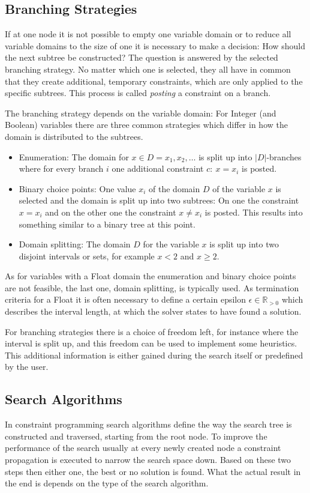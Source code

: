 \documentclass[10pt,
               a4paper,
               journal,
               ]{IEEEtran}
\begin{document}
		\subsection{Branching Strategies}
	If at one node it is not possible to empty one variable domain or to reduce all variable domains to the size of one it is necessary to make a decision: How should the next subtree be constructed? The question is answered by the selected branching strategy. No matter which one is selected, they all have in common that they create additional, temporary constraints, which are only applied to the specific subtrees. This process is called \emph{posting} a constraint on a branch.
	
	The branching strategy depends on the variable domain: For Integer (and Boolean) variables there are three common strategies \cite[p.~87]{handbookCP} which differ in how the domain is distributed to the subtrees.
	\begin{itemize}
		\item Enumeration: The domain for $x \in D = {x_1, x_2, \dots}$ is split up into $|D|$-branches where for every branch $i$ one additional constraint $c:\ x = x_i$ is posted.
		\item Binary choice points: One value $x_i$ of the domain $D$ of the variable $x$ is selected and the domain is split up into two subtrees: On one the constraint $x = x_i$ and on the other one the constraint $x \ne x_i$ is posted. This results into something similar to a binary tree at this point.
		\item Domain splitting: The domain $D$ for the variable $x$ is split up into two disjoint intervals or sets, for example $x < 2$ and $x \ge 2$.
	\end{itemize}
	
	As for variables with a Float domain the enumeration and binary choice points are not feasible, the last one, domain splitting, is typically used. As termination criteria for a Float it is often necessary to define a certain epsilon $\epsilon \in \mathbb{R}_{>0}$ which describes the interval length, at which the solver states to have found a solution.
	
	For branching strategies there is a choice of freedom left, for instance where the interval is split up, and this freedom can be used to implement some heuristics. This additional information is either gained during the search itself or predefined by the user.
	
	\subsection{Search Algorithms}
	In constraint programming search algorithms define the way the search tree is constructed and traversed, starting from the root node. To improve the performance of the search usually at every newly created node a constraint propagation is executed to narrow the search space down. Based on these two steps then either one, the best or no solution is found. What the actual result in the end is depends on the type of the search algorithm.
	
\end{document}
